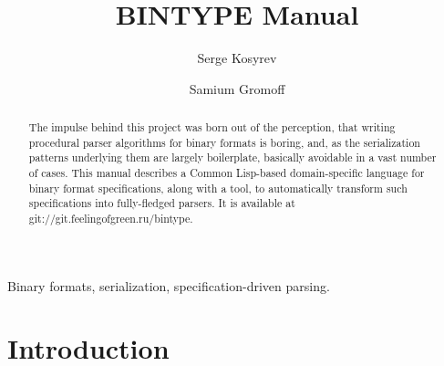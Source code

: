 \documentclass[%
	final,
	notitlepage,
	narroweqnarray,
	inline,
	twoside,
	]{ieee}
\begin{document}
\title[BINTYPE Manual]{%
       BINTYPE Manual}

\author[KOSYREV\'{A}R]{Serge Kosyrev%
}
\author[GROMOFF\'{A}R]{Samium Gromoff%
}



\maketitle               

\begin{abstract} 
The impulse behind this project was born out of the perception,
that writing procedural parser algorithms for binary formats
is boring, and, as the serialization patterns underlying them are
largely boilerplate, basically avoidable in a vast number of cases.
This manual describes a Common Lisp-based domain-specific language for binary
format specifications, along with a tool, to automatically transform such
specifications into fully-fledged parsers.
It is available at \mbox{git://git.feelingofgreen.ru/bintype}.
\end{abstract}

\begin{keywords}
Binary formats, serialization, specification-driven parsing.
\end{keywords}

\section{Introduction}
\end{document}
